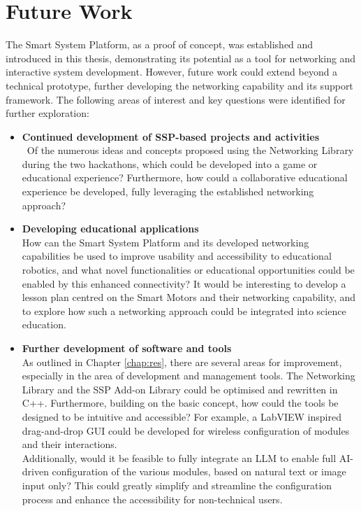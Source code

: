 \cleardoublepage%
\chapter{\label{chap:fut}Future Work}%

The Smart System Platform, as a proof of concept, was established and introduced in this thesis, demonstrating its potential as a tool for networking and interactive system development. However, future work could extend beyond a technical prototype, further developing the networking capability and its support framework. The following areas of interest and key questions were identified for further exploration:

\begin{itemize}
    \item \textbf{Continued development of SSP-based projects and activities}\\\
    Of the numerous ideas and concepts proposed using the Networking Library during the two hackathons, which could be developed into a game or educational experience? Furthermore, how could a collaborative educational experience be developed, fully leveraging the established networking approach? 
    
    \item \textbf{Developing educational applications}\\
    How can the Smart System Platform and its developed networking capabilities be used to improve usability and accessibility to educational robotics, and what novel functionalities or educational opportunities could be enabled by this enhanced connectivity? It would be interesting to develop a lesson plan centred on the Smart Motors and their networking capability, and to explore how such a networking approach could be integrated into science education.
    
    \item \textbf{Further development of software and tools}\\
    As outlined in Chapter \ref{chap:res}, there are several areas for improvement, especially in the area of development and management tools. 
    The Networking Library and the SSP Add-on Library could be optimised and rewritten in C++. Furthermore, building on the basic concept, how could the tools be designed to be intuitive and accessible? For example, a LabVIEW inspired drag-and-drop GUI could be developed for wireless configuration of modules and their interactions. \\
    Additionally, would it be feasible to fully integrate an LLM to enable full AI-driven configuration of the various modules, based on natural text or image input only? This could greatly simplify and streamline the configuration process and enhance the accessibility for non-technical users. 


\end{itemize}
